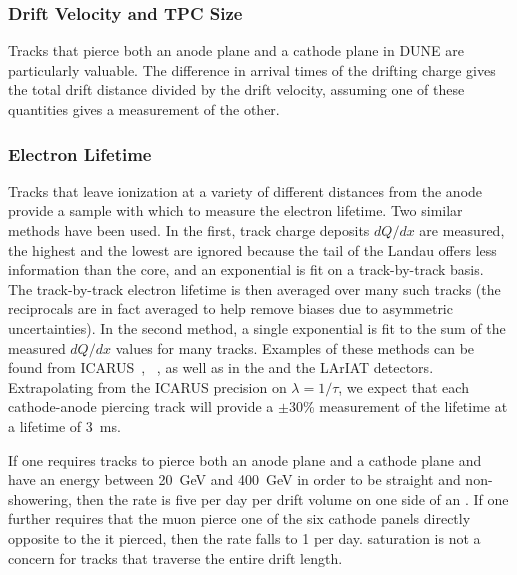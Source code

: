 \subsubsection{Drift Velocity and TPC Size}

Tracks that pierce both an anode plane and a cathode plane in DUNE are particularly valuable. %
The difference in arrival times of the drifting charge gives the total drift distance divided by the
drift velocity, assuming one of these quantities gives a measurement of the other.

\subsubsection{Electron Lifetime}

Tracks that leave ionization at a variety of different distances from the anode provide a sample
with which to measure the electron lifetime.  Two similar methods have been used.  In the
first, track charge deposits $dQ/dx$ are measured, the highest and the lowest are ignored because
the tail of the Landau offers less information than the core, and an exponential is fit on a 
track-by-track basis.  The track-by-track electron lifetime is then averaged over many such tracks
(the reciprocals are in fact averaged to help remove biases due to asymmetric uncertainties).  In
the second method, a single exponential is fit to the sum of the measured $dQ/dx$ values for many tracks.
Examples of these methods can be found from ICARUS~\cite{Antonello:2014eha}, 
\microboone~\cite{uBlifetime}, as well as in the  and
the LArIAT detectors.  Extrapolating from the ICARUS precision on $\lambda = 1/\tau$, we expect
that each cathode-anode piercing track will provide a $\pm 30$\% measurement of the lifetime
at a lifetime of \SI{3}{\milli\s}.

If one requires tracks to pierce both an anode plane and a cathode plane and have an energy between \SI{20}{\GeV}
and \SI{400}{\GeV} in order to be straight and non-showering, then the rate is five per day per drift volume
on one side of an .  If one further requires that the muon pierce one of the six cathode panels
directly opposite to the  it pierced, then the rate falls to \num{1} per day.   saturation is not
a concern for tracks that traverse the entire drift length.

